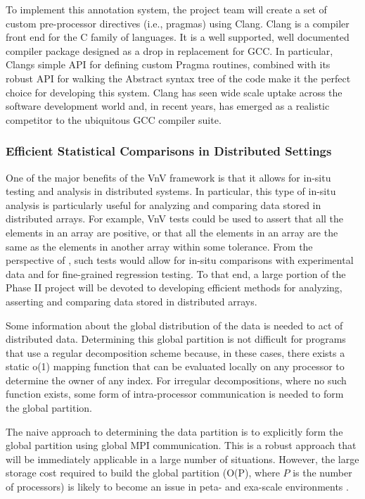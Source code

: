 To implement this annotation system, the project team will create a set of custom pre-processor directives (i.e., pragmas) using Clang. Clang is a compiler front end for the C family of languages. It is a well supported, well documented compiler package designed as a drop in replacement for GCC. In particular, Clangs simple API for defining custom Pragma routines, combined with its robust API for walking the Abstract syntax tree of the code make it the perfect choice for developing this system. Clang has seen wide scale uptake across the software development world and, in recent years, has emerged as a realistic competitor to the ubiquitous GCC compiler suite.  

\subsubsection{Efficient Statistical Comparisons in Distributed Settings} 

One of the major benefits of the VnV framework is that it allows for in-situ testing and analysis in distributed systems. In particular, this type of in-situ analysis is particularly useful for analyzing and comparing data stored in distributed arrays. For example, VnV tests could be used to assert that all the elements in an array are positive, or that all the elements in an array are the same as the elements in another array within some tolerance. From the perspective of \VV, such tests would allow for in-situ comparisons with experimental data and for fine-grained regression testing. To that end, a large portion of the Phase II project will be devoted to developing efficient methods for analyzing, asserting and comparing data stored in distributed arrays. 

Some information about the global distribution of the data is needed to act of distributed data. Determining this global partition is not difficult for programs that use a regular decomposition scheme because, in these cases, there exists a static o(1) mapping function that can be evaluated locally on any processor to determine the owner of any index. For irregular decompositions, where no such function exists, some form of intra-processor communication is needed to form the global partition. 

The naive approach to determining the data partition is to explicitly form the global partition using global MPI communication. This is a robust approach that will be immediately applicable in a large number of situations. However, the large storage cost required to build the global partition (O(P), where $P$ is the number of processors) is likely to become an issue in peta- and exa-scale environments \cite{hypre-assumed}. 

